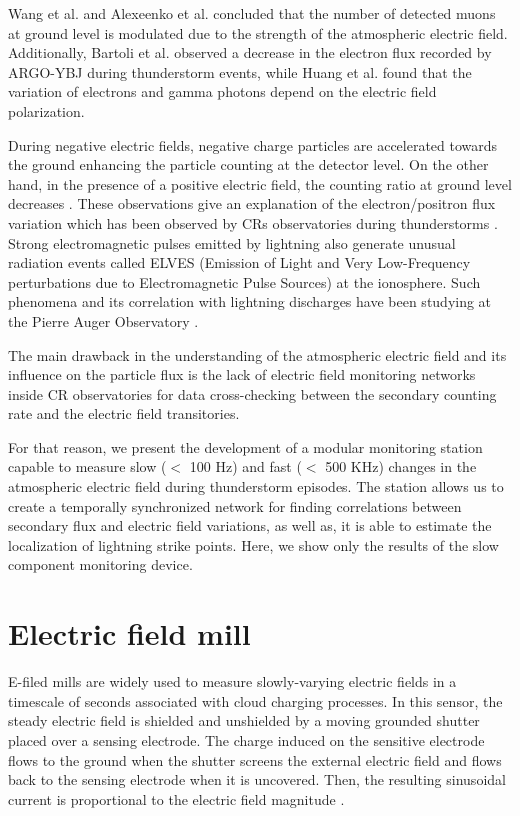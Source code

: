 \documentclass[a4paper]{jpconf}
\begin{document}
Wang et al. \cite{wang2012effect} and Alexeenko et al. \cite{alexeenko2002transient} concluded that the number of detected muons at ground level is modulated due to the strength of the atmospheric electric field. Additionally, Bartoli et al. \cite{bartoli2018observation} observed a decrease in the electron flux recorded by ARGO-YBJ during thunderstorm events, while Huang et al. \cite{zhao2019effects} found that the variation of electrons and gamma photons depend on the electric field polarization.

During negative electric fields, negative charge particles are accelerated towards the ground enhancing the particle counting at the detector level. On the other hand, in the presence of a positive electric field, the counting ratio at ground level decreases \cite{dorman2013cosmic}. These observations give an explanation of the electron/positron flux variation which has been observed by CRs observatories during thunderstorms \cite{Marteau-etal2012}.
Strong electromagnetic pulses emitted by lightning also generate unusual radiation events called ELVES (Emission of Light and Very Low-Frequency perturbations due to Electromagnetic Pulse Sources) at the ionosphere. Such phenomena and its correlation with lightning discharges have been studying at the Pierre Auger Observatory \cite{Mussa2019}. 

The main drawback in the understanding of the atmospheric electric field and its influence on the particle flux is the lack of electric field monitoring networks inside CR observatories for data cross-checking between the secondary counting rate and the electric field transitories.

For that reason, we present the development of a modular monitoring station capable to measure slow ($<$ 100 Hz) and fast ($<$ 500 KHz) changes in the atmospheric electric field during thunderstorm episodes. The station allows us to create a temporally synchronized network for finding correlations between secondary flux and electric field variations, as well as, it is able to estimate the localization of lightning strike points. Here, we show only the results of the slow component monitoring device. 

\section{Electric field mill}
E-filed mills are widely used to measure slowly-varying electric fields in a timescale of seconds associated with cloud charging processes. In this sensor, the steady electric field is shielded and unshielded by a moving grounded shutter placed over a sensing electrode. The charge induced on the sensitive electrode flows to the ground when the shutter screens the external electric field and flows back to the sensing electrode when it is uncovered. Then, the resulting sinusoidal current is proportional to the electric field magnitude \cite{Rakov2016}.  
\end{document}
